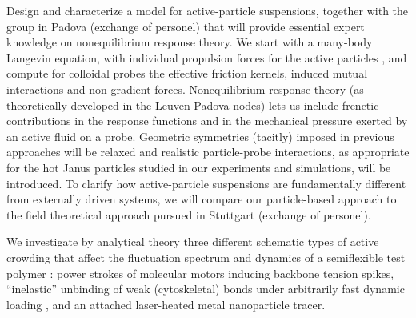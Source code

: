 \begin{workpackage}[id=WPactive,wphases=0-48,
  short=Active Particle Suspensions,%
  title=Probing active particle suspensions with colloids and polymers,
  lead=ULEI,
  ULEIRM=96,UNIPDRM=6,USTUTTRM=2]
\begin{tasklist}

\begin{task}[title=Nonequilibrium equations of state (NEOS),id=task1,lead=ULEI,partners={UNIPD,USTUTT},
wphases={0-40!0.5,24-30,36-38}]
Design and characterize a model for active-particle suspensions, together with the group
in Padova (exchange of personel) that will provide essential expert knowledge on
nonequilibrium response theory.
%
We start with a many-body Langevin equation, with individual propulsion forces for the
active particles \cite{solon-etal:2015}, and compute for colloidal probes the effective
friction kernels, induced mutual interactions and non-gradient forces.
%
Nonequilibrium response theory (as theoretically developed in the Leuven-Padova nodes) lets us include 
frenetic contributions in the response functions \cite{baiesi-wynants:2009} and in the mechanical pressure 
exerted by an active fluid on a probe. 
%
Geometric symmetries (tacitly) imposed in previous approaches will be relaxed and realistic particle-probe interactions, 
as appropriate for the hot Janus particles studied in our experiments and simulations, will be introduced.
%
To clarify how active-particle suspensions are fundamentally different from externally driven systems,
we will compare our particle-based approach to the field theoretical approach pursued in Stuttgart (exchange of personel). 

\end{task}

\begin{task}[title=Active Crowding,id=task2,lead=ULEI,partners={KUL},wphases=0-40!0.5]
We investigate by analytical theory three different schematic types of active crowding 
that affect the fluctuation spectrum and dynamics of a semiflexible test polymer \cite{otto-etal:2013}: 
power strokes of molecular motors inducing backbone tension spikes,
``inelastic'' \cite{gralka-kroy:2015}unbinding of weak (cytoskeletal) bonds under 
arbitrarily fast dynamic loading \cite{bullerjahn-sturm-kroy:2014}, and an attached laser-heated metal nanoparticle tracer.
\end{task}


\end{tasklist}
\end{workpackage}

